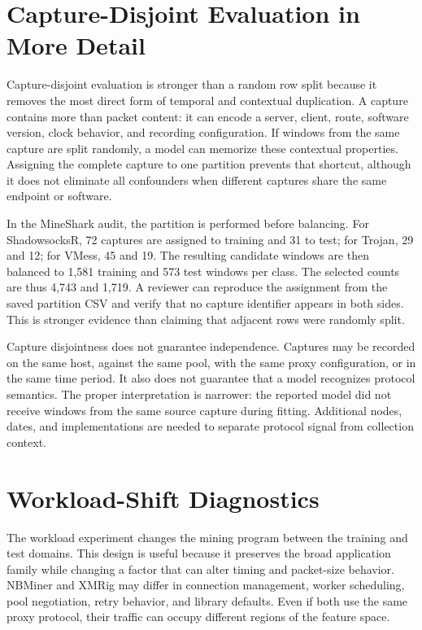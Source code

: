 \documentclass[conference]{IEEEtran}
\begin{document}
\section{Capture-Disjoint Evaluation in More Detail}
Capture-disjoint evaluation is stronger than a random row split because it removes the most direct form of temporal and contextual duplication. A capture contains more than packet content: it can encode a server, client, route, software version, clock behavior, and recording configuration. If windows from the same capture are split randomly, a model can memorize these contextual properties. Assigning the complete capture to one partition prevents that shortcut, although it does not eliminate all confounders when different captures share the same endpoint or software.

In the MineShark audit, the partition is performed before balancing. For ShadowsocksR, 72 captures are assigned to training and 31 to test; for Trojan, 29 and 12; for VMess, 45 and 19. The resulting candidate windows are then balanced to 1,581 training and 573 test windows per class. The selected counts are thus 4,743 and 1,719. A reviewer can reproduce the assignment from the saved partition CSV and verify that no capture identifier appears in both sides. This is stronger evidence than claiming that adjacent rows were randomly split.

Capture disjointness does not guarantee independence. Captures may be recorded on the same host, against the same pool, with the same proxy configuration, or in the same time period. It also does not guarantee that a model recognizes protocol semantics. The proper interpretation is narrower: the reported model did not receive windows from the same source capture during fitting. Additional nodes, dates, and implementations are needed to separate protocol signal from collection context.

\section{Workload-Shift Diagnostics}
The workload experiment changes the mining program between the training and test domains. This design is useful because it preserves the broad application family while changing a factor that can alter timing and packet-size behavior. NBMiner and XMRig may differ in connection management, worker scheduling, pool negotiation, retry behavior, and library defaults. Even if both use the same proxy protocol, their traffic can occupy different regions of the feature space.
\end{document}
